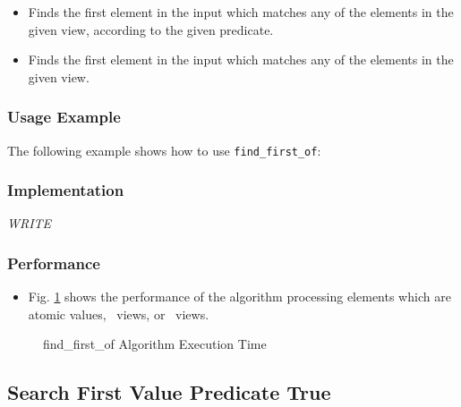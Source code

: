 \begin{itemize}
\item
Finds the first element in the input which matches any of the elements in the given view, according to the given predicate. 
\item
Finds the first element in the input which matches any of the elements in the given view. 
\end{itemize}

\subsubsection{Usage Example} %

The following example shows how to use \texttt{find\_first\_of}:


\subsubsection{Implementation} %

\textit{WRITE}

\subsubsection{Performance} %

\begin{itemize}
\item
Fig. \ref{fig:find-first-of-alg-exec-exper}
shows the performance of the algorithm processing
elements which are atomic values, \stl\ views, or \stapl\ views.
\end{itemize}

\begin{figure}[p]
\caption{find\_first\_of Algorithm Execution Time}
\label{fig:find-first-of-alg-exec-exper}
\end{figure}

 
\subsection{Search First Value Predicate True} \label{sec-srch-find_if}

